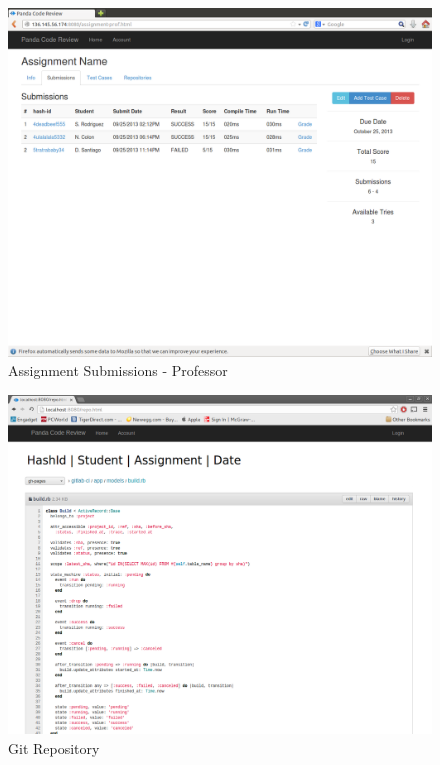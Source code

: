 \begin{figure}[H]
	\centering
	\includegraphics[width=\textwidth]{img/assignment-sub-prof}
	\caption{Assignment Submissions - Professor}
\end{figure}

\begin{figure}[H]
	\centering
	\includegraphics[width=\textwidth]{img/repo}
	\caption{Git Repository}
\end{figure}


